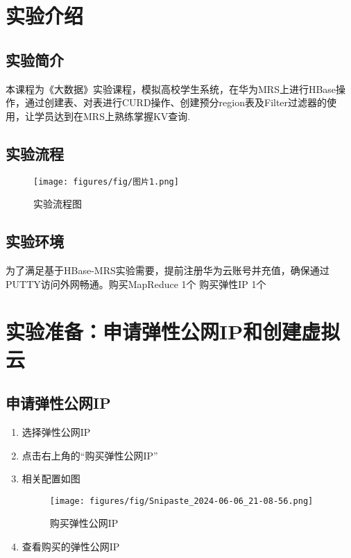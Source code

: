 \documentclass[12pt,hyperref,a4paper,UTF8]{ctexart}
\begin{document}
\cover

%
%

\thispagestyle{empty} %

\newpage
\tableofcontents

\newpage

\section{实验介绍}
\subsection*{实验简介}
本课程为《大数据》实验课程，模拟高校学生系统，在华为MRS上进行HBase操作，通过创建表、对表进行CURD操作、创建预分region表及Filter过滤器的使用，让学员达到在MRS上熟练掌握KV查询.
\subsection*{实验流程}
\begin{figure}[H]
    \centering
    \texttt{[image: figures/fig/图片1.png]}
    \caption{实验流程图}
    \label{fig:1}
\end{figure}

\subsection*{实验环境}
为了满足基于HBase-MRS实验需要，提前注册华为云账号并充值，确保通过PUTTY访问外网畅通。购买MapReduce 1个
购买弹性IP 1个


\section{实验准备：申请弹性公网IP和创建虚拟云}
\subsection*{申请弹性公网IP}
\begin{enumerate}
    \item 选择弹性公网IP
    \item 点击右上角的“购买弹性公网IP”
    \item 相关配置如图
    \begin{figure}[H]
        \centering
        \texttt{[image: figures/fig/Snipaste\_2024-06-06\_21-08-56.png]}
        \caption{购买弹性公网IP}
        \label{fig:4}
    \end{figure}
    \item 查看购买的弹性公网IP
\end{enumerate}
\end{document}

